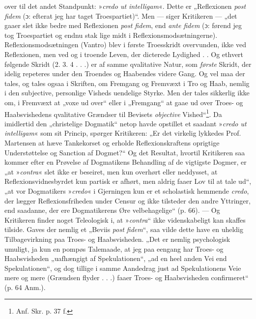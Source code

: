 \documentclass[12pt,a4paper]{book}
\newcommand{\opage}[1]{\marginnote{\footnotesize\textit{[#1]}}}
\begin{document}
over til det andet Standpunkt: »\emph{\textit{credo ut intelligam}}«. Dette er „Reflexionen \textit{post fidem} (ɔ: efterat jeg har taget Troespartiet)“. Men --- siger Kritikeren --- „det gaaer slet ikke bedre med Reflexionen \textit{post fidem}, end \textit{ante fidem} (ɔ: førend jeg tog Troespartiet og endnu stak lige midt i Reflexionsmodsætningerne). Reflexionsmodsætningen (Vantro) blev i første Troesskridt overvunden, ikke ved Reflexionen, men ved og i troende Leven, der dicterede Lydighed . . Og ethvert følgende Skridt (2. 3. 4 . . .) er af samme qvalitative Natur, som \emph{første} Skridt, der idelig repeteres under den Troendes og Haabendes videre Gang. Og vel maa der tales, og tales ogsaa i Skriften, om Fremgang og Fremvæxt i Tro og Haab, nemlig i den subjective, personlige Visheds uendelige Styrke. Men der tales sikkerlig ikke om, i Fremvæxt at „voxe ud over“ eller i „Fremgang“ at gaae ud over Troes- og Haabsvishedens qvalitative Grændser til Bevisets \emph{objective} Vished“\footnote{Anf. Skr. p. 37 f.}. Da imidlertid den „christelige Dogmatik“ netop havde opstillet et saadant »\textit{credo ut intelligam}« som sit Princip, spørger Kritikeren: „Er det virkelig lykkedes Prof. Martensen at hæve Tankekorset og erholde Reflexionskraftens oprigtige Understøttelse og Sanction af Dogmet?“ Og det Resultat, hvortil Kritikeren saa kommer efter en Prøvelse af Dogmatikens Behandling af de vigtigste Dogmer, er „at »\textit{contra}« slet ikke er beseiret, men kun overhørt eller neddysset, at Reflexionsvidnesbyrdet kun partisk er afhørt, men aldrig faaer Lov til at tale ud“, „at vor Dogmatikers »\textit{credo}« i Gjerningen kun er et scholastisk hemmende \textit{credo}, der lægger Reflexionsfriheden under Censur og ikke tilsteder den andre Yttringer, end saadanne, der ere Dogmatikerens Øre velbehagelige“ (p. 66). ---
Og Kritikeren finder noget Teleologisk i, at »\textit{contra}“ ikke videnskabeligt kan skaffes tilside. Gaves der nemlig et „Beviis \textit{post fidem}“, saa vilde dette have en uheldig Tilbagevirkning
\opage{30}\setcounter{footnote}{0}%
paa Troes- og Haabsvisheden. „Det er nemlig psychologisk
umuligt, ja kun en pompøs Talemaade, at jeg paa eengang
har Troes- og Haabsvisheden „uafhængigt af Spekulationen“,
„ad en heel anden Vei end Spekulationen“, og dog tillige i
samme Aandedrag just ad Spekulationens Veie mere og mere
(Grændsen flyder . . .) faaer Troes- og Haabsvisheden
confirmeret“ (p. 64 Anm.).
\end{document}

